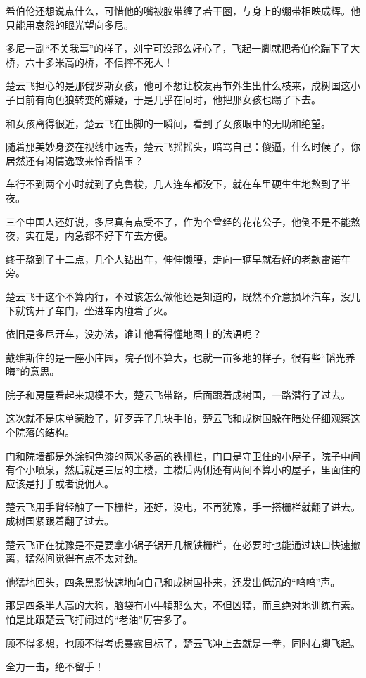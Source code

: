 希伯伦还想说点什么，可惜他的嘴被胶带缠了若干圈，与身上的绷带相映成辉。他只能用哀怨的眼光望向多尼。

多尼一副“不关我事”的样子，刘宁可没那么好心了，飞起一脚就把希伯伦踹下了大桥，六十多米高的桥，不信摔不死人！

楚云飞担心的是那俄罗斯女孩，他可不想让校友再节外生出什么枝来，成树国这小子目前有向色狼转变的嫌疑，于是几乎在同时，他把那女孩也踢了下去。

和女孩离得很近，楚云飞在出脚的一瞬间，看到了女孩眼中的无助和绝望。

随着那美妙身姿在视线中远去，楚云飞摇摇头，暗骂自己：傻逼，什么时候了，你居然还有闲情逸致来怜香惜玉？

车行不到两个小时就到了克鲁梭，几人连车都没下，就在车里硬生生地熬到了半夜。

三个中国人还好说，多尼真有点受不了，作为个曾经的花花公子，他倒不是不能熬夜，实在是，内急都不好下车去方便。

终于熬到了十二点，几个人钻出车，伸伸懒腰，走向一辆早就看好的老款雷诺车旁。

楚云飞干这个不算内行，不过该怎么做他还是知道的，既然不介意损坏汽车，没几下就钩开了车门，坐进车内碰着了火。

依旧是多尼开车，没办法，谁让他看得懂地图上的法语呢？

戴维斯住的是一座小庄园，院子倒不算大，也就一亩多地的样子，很有些“韬光养晦”的意思。

院子和房屋看起来规模不大，楚云飞带路，后面跟着成树国，一路潜行了过去。

这次就不是床单蒙脸了，好歹弄了几块手帕，楚云飞和成树国躲在暗处仔细观察这个院落的结构。

门和院墙都是外涂铜色漆的两米多高的铁栅栏，门口是守卫住的小屋子，院子中间有个小喷泉，然后就是三层的主楼，主楼后两侧还有两间不算小的屋子，里面住的应该是打手或者说佣人。

楚云飞用手背轻触了一下栅栏，还好，没电，不再犹豫，手一搭栅栏就翻了进去。成树国紧跟着翻了过去。

楚云飞正在犹豫是不是要拿小锯子锯开几根铁栅栏，在必要时也能通过缺口快速撤离，猛然间觉得有点不太对劲。

他猛地回头，四条黑影快速地向自己和成树国扑来，还发出低沉的“呜呜”声。

那是四条半人高的大狗，脑袋有小牛犊那么大，不但凶猛，而且绝对地训练有素。怕是比跟楚云飞打闹过的“老油”厉害多了。

顾不得多想，也顾不得考虑暴露目标了，楚云飞冲上去就是一拳，同时右脚飞起。

全力一击，绝不留手！

